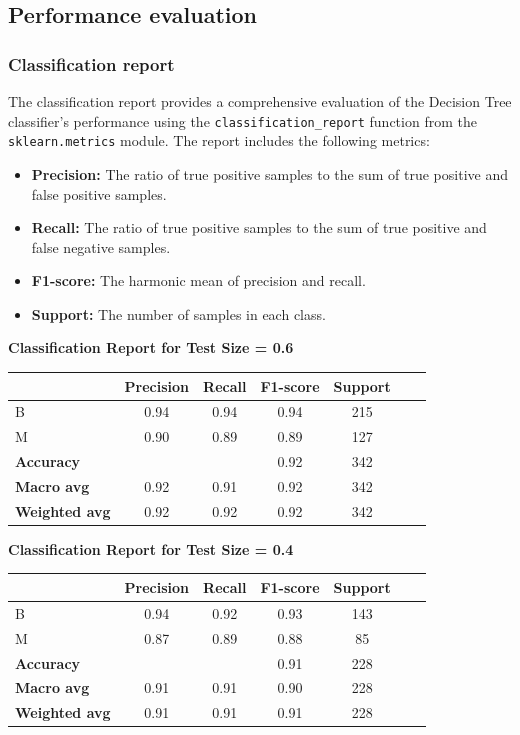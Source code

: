 \subsection{Performance evaluation}

\subsubsection{Classification report}

The classification report provides a comprehensive evaluation of the Decision Tree classifier's performance using the \texttt{classification\_report} function from the \texttt{sklearn.metrics} module. The report includes the following metrics:
\begin{itemize}
    \item \textbf{Precision:} The ratio of true positive samples to the sum of true positive and false positive samples.
    \item \textbf{Recall:} The ratio of true positive samples to the sum of true positive and false negative samples.
    \item \textbf{F1-score:} The harmonic mean of precision and recall.
    \item \textbf{Support:} The number of samples in each class.
\end{itemize}

\textbf{Classification Report for Test Size = 0.6}

\begin{tabular}{lcccccc}
\hline
 & \textbf{Precision} & \textbf{Recall} & \textbf{F1-score} & \textbf{Support} \\
\hline
B & 0.94 & 0.94 & 0.94 & 215 \\
M & 0.90 & 0.89 & 0.89 & 127 \\
\hline
\textbf{Accuracy} & & & 0.92 & 342 \\
\textbf{Macro avg} & 0.92 & 0.91 & 0.92 & 342 \\
\textbf{Weighted avg} & 0.92 & 0.92 & 0.92 & 342 \\
\hline
\end{tabular}

\vspace{2em}

\textbf{Classification Report for Test Size = 0.4}

\begin{tabular}{lcccccc}
\hline
 & \textbf{Precision} & \textbf{Recall} & \textbf{F1-score} & \textbf{Support} \\
\hline
B & 0.94 & 0.92 & 0.93 & 143 \\
M & 0.87 & 0.89 & 0.88 & 85 \\
\hline
\textbf{Accuracy} & & & 0.91 & 228 \\
\textbf{Macro avg} & 0.91 & 0.91 & 0.90 & 228 \\
\textbf{Weighted avg} & 0.91 & 0.91 & 0.91 & 228 \\
\hline
\end{tabular}

